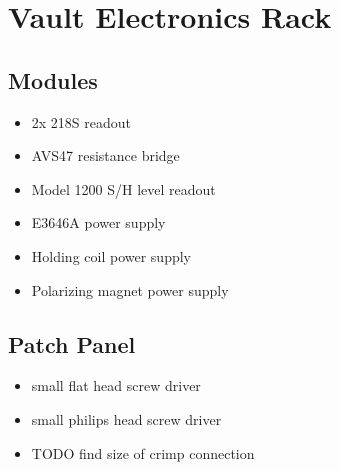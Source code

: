 \section{Vault Electronics Rack}
\subsection{Modules}
\begin{itemize}
 \item 2x  218S readout
\item AVS47 resistance bridge
\item {} Model 1200 S/H level readout
\item {} E3646A power supply
\item Holding coil power supply
\item Polarizing magnet power supply
\end{itemize}
  \subsection{Patch Panel}
\begin{itemize}
 \item small flat head screw driver
 \item small philips head screw driver
\item TODO find size of crimp connection
\end{itemize}

